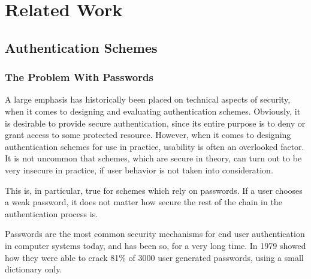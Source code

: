 \chapter{Related Work}\label{ch:examples}

\bigskip

\section{Authentication Schemes}
\subsection{The Problem With Passwords}

A large emphasis has historically been placed on technical aspects of security, when it comes to designing and evaluating authentication schemes.
Obviously, it is desirable to provide secure authentication, since its entire purpose is to deny or grant access to some protected resource.
However, when it comes to designing authentication schemes for use in practice, usability is often an overlooked factor.
It is not uncommon that schemes, which are secure in theory, can turn out to be very insecure in practice, if user behavior is not taken into consideration.

This is, in particular, true for schemes which rely on passwords.
If a user chooses a weak password, it does not matter how secure the rest of the chain in the authentication process is.

Passwords are the most common security mechanisms for end user authentication in computer systems today, and has been so, for a very long time.
In 1979 \citet{morris1979password} showed how they were able to crack 81\% of 3000 user generated passwords, using a small dictionary only.
 
